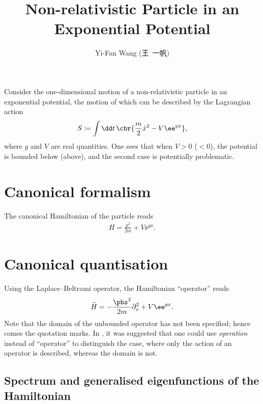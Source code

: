 \documentclass[a4paper,11pt]{article}
\title{Non-relativistic Particle in an Exponential Potential}
\author{Yi-Fan Wang (王\ 一帆)}
\begin{document}
\maketitle

Consider the one-dimensional motion of a non-relativistic particle in an 
exponential potential, the motion of which can be described by the Lagrangian 
action
\begin{align}
S \coloneqq \int \dd t\,\cbr{\frac{m}{2}\dot{x}^2 - V\ee^{g x}},
\end{align}
where $g$ and $V$ are real quantities. One sees that when $V > 0$ ($< 0$), the 
potential is bounded below (above), and the second case is potentially 
problematic.

\section{Canonical formalism}


The canonical Hamiltonian of the particle reads
\begin{align}
H = \frac{p^2}{2m} + V\ee^{g x}.
\end{align}

\section{Canonical quantisation}


Using the Laplace--Beltrami operator, the Hamiltonian ``operator'' reads
\begin{align}
\widehat{H} = -\frac{\phs^2}{2m}\partial_x^2 + V\ee^{g x}.
\end{align}
Note that the domain of the unbounded operator has not been specified; hence 
comes the quotation marks. In \cite[ch.\ 4]{Gitman2012}, it was suggested 
that one could use \emph{operation} instead of ``operator'' to distinguish the 
case, where only the action of an operator is described, whereas the domain is 
not.

\subsection{Spectrum and generalised eigenfunctions of the Hamiltonian}

\end{document}
